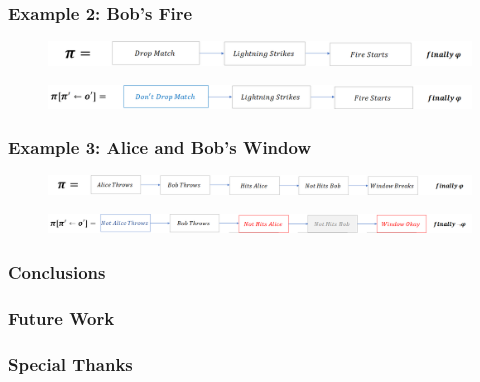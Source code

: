 \documentclass{beamer}
\theoremstyle{plain}
\theoremstyle{definition}
\begin{document}
\begin{frame}
\frametitle{Example 2: Bob's Fire}

\begin{figure}
\includegraphics[scale=.28]{bobPlanOriginal}
\end{figure}

\begin{figure}
\includegraphics[scale=.28]{bobPlanCounterfactual}
\end{figure}

\end{frame}


\begin{frame}
\frametitle{Example 3: Alice and Bob's Window}

\begin{figure}
\includegraphics[scale=.28]{aliceBobPlanOriginal}
\end{figure}

\begin{figure}
\includegraphics[scale=.28]{aliceBobPlanCounterfactual3}
\end{figure}
\end{frame}


\begin{frame}
\frametitle{Conclusions}

\end{frame}


\begin{frame}
\frametitle{Future Work}

\end{frame}

\begin{frame}
\frametitle{Special Thanks}

\end{frame}
\end{document}
